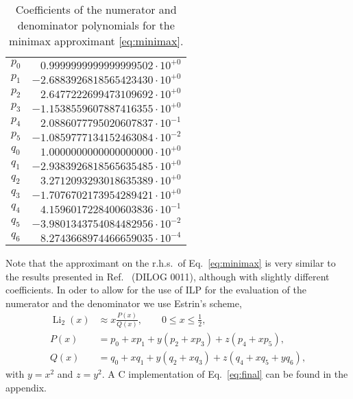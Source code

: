 \documentclass[10pt,DIV16,twocolumn,numbers=noenddot]{scrartcl}
\newcommand{\Li}{\operatorname{Li}_2}
\begin{document}
\begin{table}[t]
  \centering
  \caption{Coefficients of the numerator and denominator polynomials
    for the minimax approximant \eqref{eq:minimax}.}
  \begin{tabular}{lr}
    \toprule
    $p_0$ & $ 0.9999999999999999502\cdot 10^{+0}$ \\
    $p_1$ & $-2.6883926818565423430\cdot 10^{+0}$ \\
    $p_2$ & $ 2.6477222699473109692\cdot 10^{+0}$ \\
    $p_3$ & $-1.1538559607887416355\cdot 10^{+0}$ \\
    $p_4$ & $ 2.0886077795020607837\cdot 10^{-1}$ \\
    $p_5$ & $-1.0859777134152463084\cdot 10^{-2}$ \\
    $q_0$ & $ 1.0000000000000000000\cdot 10^{+0}$ \\
    $q_1$ & $-2.9383926818565635485\cdot 10^{+0}$ \\
    $q_2$ & $ 3.2712093293018635389\cdot 10^{+0}$ \\
    $q_3$ & $-1.7076702173954289421\cdot 10^{+0}$ \\
    $q_4$ & $ 4.1596017228400603836\cdot 10^{-1}$ \\
    $q_5$ & $-3.9801343754084482956\cdot 10^{-2}$ \\
    $q_6$ & $ 8.2743668974466659035\cdot 10^{-4}$ \\
    \bottomrule
  \end{tabular}
  \label{tab:coeffs}
\end{table}
%
Note that the approximant on the r.h.s.\ of Eq.~\eqref{eq:minimax} is
very similar to the results presented in Ref.~\cite{morris} (DILOG
0011), although with slightly different coefficients.  In oder to
allow for the use of ILP for the evaluation of the numerator and the
denominator we use Estrin's scheme,
%
\begin{align}
  \Li(x) &\approx x\frac{P(x)}{Q(x)}, \qquad 0\leq x \leq \frac{1}{2}, \label{eq:final}\\
  P(x) &= p_0 + x p_1 + y (p_2 + x p_3) + z (p_4 + x p_5), \\
  Q(x) &= q_0 + x q_1 + y (q_2 + x q_3) + z (q_4 + x q_5 + y q_6),
\end{align}
%
with $y=x^2$ and $z=y^2$.  A C implementation of Eq.~\eqref{eq:final}
can be found in the appendix.
\end{document}
